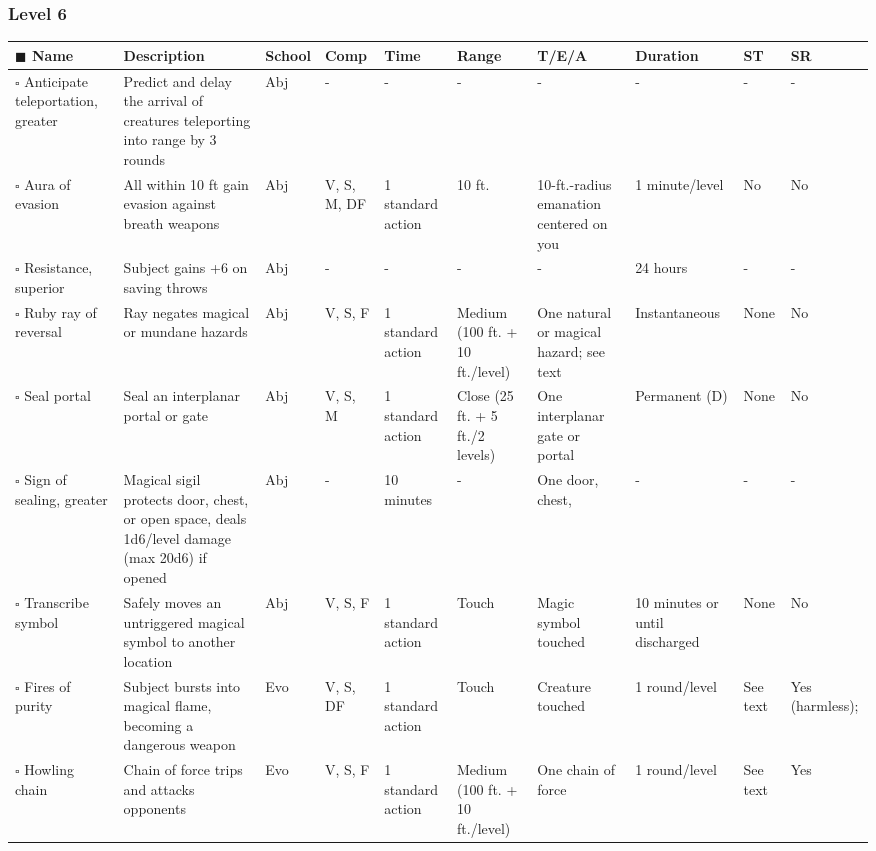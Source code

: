 \documentclass[12pt, a4paper]{article}
\begin{document}
\begin{center}
  \subsubsection*{Level 6}
  \begin{longtable}[H]{ p{8em} p{15em} p{2em} p{5em} p{6em} p{6em} p{10em} p{6em} p{5em} p{2em} }
    \(\blacksquare\) \textbf{Name} & \textbf{Description} & \textbf{School} & \textbf{Comp} & \textbf{Time} & \textbf{Range} & \textbf{T/E/A} & \textbf{Duration} & \textbf{ST} & \textbf{SR}\\
    \endhead
    \(\square\) Anticipate teleportation, greater & Predict and delay the arrival of creatures teleporting into range by 3 rounds & Abj & - & - & - & - & - & - & -\\
    \(\square\) Aura of evasion & All within 10 ft gain evasion against breath weapons & Abj & V, S, M, DF & 1 standard action & 10 ft. & 10-ft.-radius emanation centered on you & 1 minute/level & No & No\\
    \(\square\) Resistance, superior & Subject gains +6 on saving throws & Abj & - & - & - & - & 24 hours & - & -\\
    \(\square\) Ruby ray of reversal & Ray negates magical or mundane hazards & Abj & V, S, F & 1 standard action & Medium (100 ft. + 10 ft./level) & One natural or magical hazard; see text & Instantaneous & None & No\\
    \(\square\) Seal portal & Seal an interplanar portal or gate & Abj & V, S, M & 1 standard action & Close (25 ft. + 5 ft./2 levels) & One interplanar gate or portal & Permanent (D) & None & No\\
    \(\square\) Sign of sealing, greater & Magical sigil protects door, chest, or open space, deals 1d6/level damage (max 20d6) if opened & Abj & - & 10 minutes & - & One door, chest,  & - & - & -\\
    \(\square\) Transcribe symbol & Safely moves an untriggered magical symbol to another location & Abj & V, S, F & 1 standard action & Touch & Magic symbol touched & 10 minutes or until discharged & None & No\\
    \(\square\) Fires of purity & Subject bursts into magical ﬂame, becoming a dangerous weapon & Evo & V, S, DF & 1 standard action & Touch & Creature touched & 1 round/level & See text & Yes (harmless); \\
    \(\square\) Howling chain & Chain of force trips and attacks opponents & Evo & V, S, F & 1 standard action & Medium (100 ft. + 10 ft./level) & One chain of force & 1 round/level & See text & Yes\\

\end{longtable}
\end{center}
\end{document}
